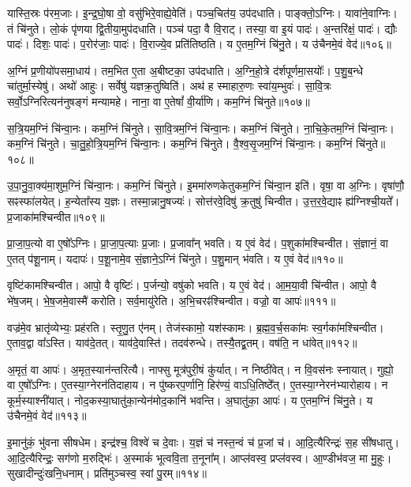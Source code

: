 यास्ति॒स्रः प॑रम॒जाः। इ॒न्द्र॒घो॒षा वो॒ वसु॑भिरे॒वाह्ये॒वेति॑। 
पञ्च॒चित॑य॒ उप॑दधाति। पाङ्क्तो॒ऽग्निः। 
यावा॑ने॒वाग्निः। तं चि॑नुते। 
लो॒कं पृ॑णया द्वि॒तीया॒मुप॑दधाति। पञ्च॑ पदा॒ वै वि॒राट्। 
तस्या॒ वा इ॒यं पादः॑। अ॒न्तरि॑क्षं॒ पादः॑। द्यौः पादः॑। 
दिशः॒ पादः॑। प॒रोर॑जाः॒ पादः॑। वि॒राज्ये॒व प्रति॑तिष्ठति। 
य ए॒तम॒ग्निं चि॑नु॒ते। य उ॑चैनमे॒वं वेद॑॥१०६॥\anuvakamend


अ॒ग्निं प्र॒णीयो॑पसमा॒धाय॑। तम॒भित ए॒ता अ॒बीष्टका॒ उप॑दधाति। 
अ॒ग्नि॒हो॒त्रे द॑र्शपूर्णमा॒सयोः᳚। प॒शु॒ब॒न्धे चा॑तुर्मा॒स्येषु॑। 
अथो॑ आहुः। सर्वेषु॑ यज्ञक्र॒तुष्विति॑। 
अथ॑ ह स्माहारु॒णः स्वा॑य॒म्भुवः॑। सा॒वि॒त्रः सर्वो॒ऽग्निरित्यन॑नुषङ्गं मन्यामहे। 
नाना॒ वा ए॒तेषां᳚ वी॒र्या॑णि। कम॒ग्निं चि॑नुते॥१०७॥


स॒त्रि॒यम॒ग्निं चि॑न्वा॒नः। कम॒ग्निं चि॑नुते। 
सा॒वि॒त्रम॒ग्निं चि॑न्वा॒नः। कम॒ग्निं चि॑नुते। 
ना॒चि॒के॒तम॒ग्निं चि॑न्वा॒नः। कम॒ग्निं चि॑नुते। 
चा॒तु॒\ar{}हो॒त्रि॒य\-म॒ग्निं चि॑न्वा॒नः। कम॒ग्निं चि॑नुते। 
वै॒श्व॒सृ॒जम॒ग्निं चि॑न्वा॒नः। कम॒ग्निं चि॑नुते॥१०८॥


उ॒पा॒नु॒वा॒क्य॑मा॒शुम॒ग्निं चि॑न्वा॒नः। कम॒ग्निं चि॑नुते। 
इ॒ममा॑रुणकेतुक\-म॒ग्निं चि॑न्वा॒न इति॑। वृषा॒ वा अ॒ग्निः। 
वृषा॑णौ॒ सꣴस्फा॑लयेत्। ह॒न्येता᳚स्य य॒ज्ञः। 
तस्मा॒न्नानु॒षज्यः॑। सोत्त॑रवे॒दिषु॑ क्र॒तुषु॑ चिन्वीत। 
उ॒त्त॒र॒वे॒द्याꣴ ह्य॑ग्निश्ची॒यते᳚। प्र॒जाका॑मश्चिन्वीत॥१०९॥


प्रा॒जा॒प॒त्यो वा ए॒षो᳚ऽग्निः। प्रा॒जा॒प॒त्याः प्र॒जाः। 
प्र॒जावा᳚न्‌ भवति। य ए॒वं वेद॑। 
प॒शुका॑मश्चिन्वीत। सं॒ज्ञानं॒ वा ए॒तत् प॑शू॒नाम्। 
यदापः॑। प॒शू॒नामे॒व सं॒ज्ञाने॒ऽग्निं चि॑नुते। 
प॒शु॒मान् भ॑वति। य ए॒वं वेद॑॥११०॥


वृष्टि॑कामश्चिन्वीत। आपो॒ वै वृष्टिः॑। 
प॒र्जन्यो॒ व\ur{}षु॑को भवति। य ए॒वं वेद॑। 
आ॒म॒या॒वी चि॑न्वीत। आपो॒ वै भे॑ष॒जम्। 
भे॒ष॒जमे॒वास्मै॑ करोति। सर्व॒मायु॑रेति। 
अ॒भि॒चरꣴ॑श्चिन्वीत। वज्रो॒ वा आपः॑॥१११॥


वज्र॑मे॒व भ्रातृ॑व्येभ्यः॒ प्रह॑रति। स्तृ॒णु॒त ए॑नम्। 
तेज॑स्कामो॒ यश॑स्कामः। ब्र॒ह्म॒व॒र्च॒सका॑मः स्व॒र्गका॑मश्चिन्वीत। 
ए॒ताव॒द्वा वा᳚ऽस्ति। याव॑दे॒तत्। 
याव॑दे॒वास्ति॑। तदव॑रुन्धे। 
तस्यै॒तद्व्र॒तम्। व\ur{}ष॑ति॒ न धा॑वेत्॥११२॥


अ॒मृतं॒ वा आपः॑। अ॒मृत॒स्यान॑न्तरित्यै। 
नाफ्सु मूत्र॑पुरी॒षं कु॑र्यात्। न निष्ठी॑वेत्। 
न वि॒वस॑नः स्नायात्। गुह्यो॒ वा ए॒षो᳚ऽग्निः। 
ए॒तस्या॒ग्नेरन॑तिदाहाय। न पु॑ष्करप॒र्णानि॒ हिर॑ण्यं॒ वाऽधि॒तिष्ठे᳚त्। 
ए॒तस्या॒ग्नेरन॑भ्यारोहाय। न कूर्म॒स्याश्नी॑यात्। 
नोद॒कस्या॒घातु॑का॒न्येन॑\-मोद॒कानि॑ भवन्ति। अ॒घातु॑का॒ आपः॑। 
य ए॒तम॒ग्निं चि॑नु॒ते। य उ॑चैनमे॒वं वेद॑॥११३॥\anuvakamend


इ॒मानु॑कं॒ भु॑वना सीषधेम। इन्द्र॑श्च॒ विश्वे॑ च दे॒वाः। 
य॒ज्ञं च॑ नस्त॒न्वं च॑ प्र॒जां च॑। आ॒दि॒त्यैरिन्द्रः॑ स॒ह सी॑षधातु। 
आ॒दि॒त्यैरिन्द्रः॒ सग॑णो म॒रुद्भिः॑। अ॒स्माकं॑ भूत्ववि॒ता त॒नूना᳚म्। 
आप्ल॑वस्व॒ प्रप्ल॑वस्व। आ॒ण्डीभ॑वज॒ मा मु॒हुः। 
सुखादीन्दुः॑खनि॒धनाम्। प्रति॑मुञ्चस्व॒ स्वां पु॒रम्॥११४॥


